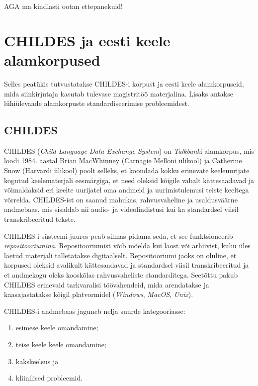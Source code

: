 \documentclass[12pt]{article}
\begin{document}
AGA ma kindlasti ootan ettepanekuid!


\newpage
\section{CHILDES ja eesti keele alamkorpused}

Selles peatükis tutvustatakse CHILDES-i korpust ja eesti keele alamkorpuseid, mida siinkirjutaja kasutab tulevase magistritöö materjalina. Lisaks antakse lühiülevaade alamkorpuste standardiseerimise probleemidest.

\subsection{CHILDES}
CHILDES (\emph{Child Language Data Exchange System}) on \emph{Talkbank}i alamkorpus, mis loodi 1984. aastal Brian MacWhinney (Carnagie Melloni ülikool) ja Catherine Snow (Harvardi ülikool) poolt selleks, et koondada kokku erinevate keeleuurijate kogutud keelematerjali eesmärgiga, et need oleksid kõigile vabalt kättesaadavad ja võimaldaksid eri keelte uurijatel oma andmeid ja uurimistulemusi teiste keeltega võrrelda. CHILDES-ist on saanud mahukas, rahvusvaheline ja usaldusväärne andmebaas, mis sisaldab nii audio- ja videolindistusi kui ka standardsel viisil transkribeeritud tekste. \citep[1]{Gillis}

CHILDES-i süsteemi juures peab silmas pidama seda, et see funktsioneerib \emph{repositooriumina}. Repositooriumist võib mõelda kui laost või arhiivist, kuhu üles laetud materjali talletatakse digitaalselt. Repositooriumi jaoks on oluline, et korpused oleksid avalikult kättesaadavad ja standardsel viisil transkribeeritud ja et andmekogu oleks kooskõlas rahvusvaheliste standarditega. Seetõttu pakub CHILDES erinevaid tarkvaralisi töövahendeid, mida arendatakse ja kaasajastatakse kõigil platvormidel (\emph{Windows}, \emph{MacOS}, \emph{Unix}). \citep[1]{Gillis}

CHILDES-i andmebaas jaguneb nelja suurde kategooriasse:
\begin{enumerate}
    \item esimese keele omandamine;
    \item teise keele keele omandamine;
    \item kakskeelsus ja 
    \item kliinilised probleemid. \citep[1]{Gillis}
\end{enumerate}
\end{document}
